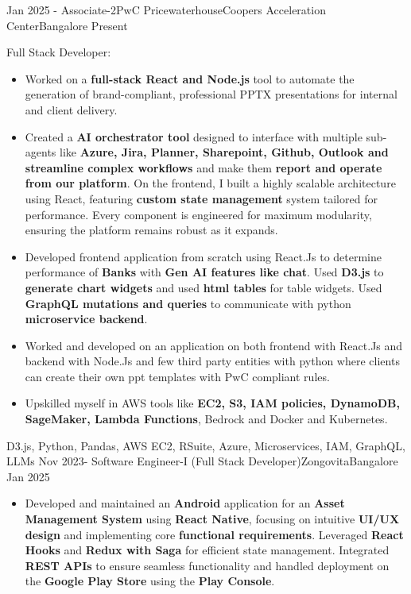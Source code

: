 \begin{experiences}
  \experience
    {Jan 2025 -} {Associate-2}{PwC PricewaterhouseCoopers Acceleration Center}{Bangalore}
    {Present} {
        \par Full Stack Developer:
        \begin{itemize}
            \item Worked on a \textbf{full-stack React and Node.js} tool to automate the generation of brand-compliant, professional PPTX presentations for internal and client delivery.   
            \item Created a \textbf{AI orchestrator tool} designed to interface with multiple sub-agents like \textbf{Azure, Jira, Planner, Sharepoint, Github, Outlook and streamline complex workflows} and make them \textbf{report and operate from our platform}. On the frontend, I built a highly scalable architecture using React, featuring \textbf{custom state management} system tailored for performance. Every component is engineered for maximum modularity, ensuring the platform remains robust as it expands.
            \item Developed frontend application from scratch using React.Js to determine performance of \textbf {Banks} with \textbf {Gen AI features like chat}. Used \textbf {D3.js} to \textbf {generate chart widgets} and used \textbf {html tables} for table widgets. Used \textbf {GraphQL mutations and queries} to communicate with python \textbf {microservice backend}. 
            \item Worked and developed on an application on both frontend with React.Js and backend with Node.Js and few third party entities with python where clients can create their own ppt templates with PwC compliant rules.
            \item Upskilled myself in AWS tools like \textbf {EC2, S3, IAM policies, DynamoDB, SageMaker, Lambda Functions}, Bedrock and Docker and Kubernetes.
        \end{itemize}
    }
    {D3.js, Python, Pandas, AWS EC2, RSuite, Azure, Microservices, IAM, GraphQL, LLMs}
  \emptySeparator
  \experience
    {Nov 2023-}   {Software Engineer-I (Full Stack Developer)}{Zongovita}{Bangalore}
    {Jan 2025} {
      \begin{itemize}
        \item{Developed and maintained an \textbf{Android} application for an \textbf{Asset Management System} using \textbf{React Native}, focusing on intuitive \textbf{UI/UX design} and implementing core \textbf{functional requirements}. Leveraged \textbf{React Hooks} and \textbf{Redux with Saga} for efficient state management. Integrated \textbf{REST APIs} to ensure seamless functionality and handled deployment on the \textbf{Google Play Store} using the \textbf{Play Console}.}

\end{itemize}}
\end{experiences}
